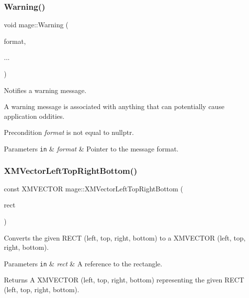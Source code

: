 \subsubsection{\texorpdfstring{Warning()}{Warning()}}
{\footnotesize\ttfamily void mage\+::\+Warning (\begin{DoxyParamCaption}\item[{const char $\ast$}]{format,  }\item[{}]{... }\end{DoxyParamCaption})}

Notifies a warning message.

A warning message is associated with anything that can potentially cause application oddities.

\begin{DoxyPrecond}{Precondition}
{\itshape format} is not equal to {\ttfamily nullptr}. 
\end{DoxyPrecond}

\begin{DoxyParams}[1]{Parameters}
\mbox{\tt in}  & {\em format} & Pointer to the message format. \\
\hline
\end{DoxyParams}
\hypertarget{namespacemage_a0003ec8e1ff669c9de7bc3894691d596}{}\label{namespacemage_a0003ec8e1ff669c9de7bc3894691d596} 
\subsubsection{\texorpdfstring{X\+M\+Vector\+Left\+Top\+Right\+Bottom()}{XMVectorLeftTopRightBottom()}}
{\footnotesize\ttfamily const X\+M\+V\+E\+C\+T\+OR mage\+::\+X\+M\+Vector\+Left\+Top\+Right\+Bottom (\begin{DoxyParamCaption}\item[{const R\+E\+CT \&}]{rect }\end{DoxyParamCaption})\hspace{0.3cm}{\ttfamily [noexcept]}}

Converts the given {\ttfamily R\+E\+CT} (left, top, right, bottom) to a {\ttfamily X\+M\+V\+E\+C\+T\+OR} (left, top, right, bottom).


\begin{DoxyParams}[1]{Parameters}
\mbox{\tt in}  & {\em rect} & A reference to the rectangle. \\
\hline
\end{DoxyParams}
\begin{DoxyReturn}{Returns}
A {\ttfamily X\+M\+V\+E\+C\+T\+OR} (left, top, right, bottom) representing the given {\ttfamily R\+E\+CT} (left, top, right, bottom). 
\end{DoxyReturn}
\hypertarget{namespacemage_abcbdb1a43e221c003f7b89863f131d11}{}\label{namespacemage_abcbdb1a43e221c003f7b89863f131d11} 
